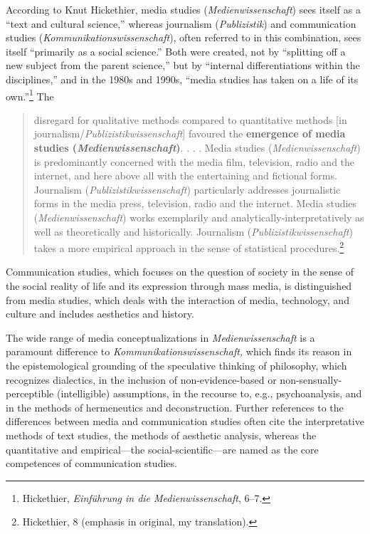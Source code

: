 \documentclass{tufte-handout}
\begin{document}
According to Knut Hickethier, media studies (\emph{Medienwissenschaft})
sees itself as a ``text and cultural science,'' whereas journalism
(\emph{Publizistik}) and communication studies
(\emph{Kommunikationswissenschaft}), often referred to in this
combination, sees itself ``primarily as a social science.'' Both were
created, not by ``splitting off a new subject from the parent science,''
but by ``internal differentiations within the disciplines,'' and in the
1980s and 1990s, ``media studies has taken on a life of its
own.''\footnote{Hickethier, \emph{Einführung in die Medienwissenschaft},
  6--7.} The

\begin{quote}
disregard for qualitative methods compared to quantitative methods {[}in
journalism/\emph{Publizistikwissenschaft}{]} favoured the
\textbf{emergence of media studies
(}\textbf{\emph{Medienwissenschaft}}\textbf{)}. . . . Media studies
(\emph{Medienwissenschaft}) is predominantly concerned with the media
film, television, radio and the internet, and here above all with the
entertaining and fictional forms. Journalism
(\emph{Publizistikwissenschaft}) particularly addresses journalistic
forms in the media press, television, radio and the internet. Media
studies (\emph{Medienwissenschaft}) works exemplarily and
analytically-interpretatively as well as theoretically and historically.
Journalism (\emph{Publizistikwissenschaft}) takes a more empirical
approach in the sense of statistical procedures.\footnote{Hickethier, 8
  (emphasis in original, my translation).}
\end{quote}

\noindent Communication studies, which focuses on the question of society in the
sense of the social reality of life and its expression through mass
media, is distinguished from media studies, which deals with the
interaction of media, technology, and culture and includes aesthetics
and history.

The wide range of media conceptualizations in \emph{Medienwissenschaft}
is a paramount difference to \emph{Kommunikationswissenschaft,} which
finds its reason in the epistemological grounding of the speculative
thinking of philosophy, which recognizes dialectics, in the inclusion of
non-evidence-based or non-sensually-perceptible (intelligible)
assumptions, in the recourse to, e.g., psychoanalysis, and in the
methods of hermeneutics and deconstruction. Further references to the
differences between media and communication studies often cite the
interpretative methods of text studies, the methods of aesthetic
analysis, whereas the quantitative and empirical---the
social-scientific---are named as the core competences of communication
studies.
\end{document}
